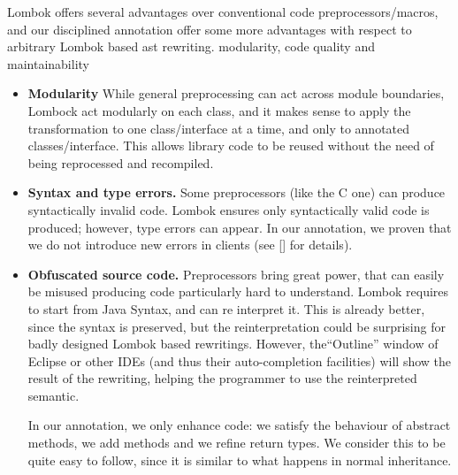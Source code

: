 \noindent 
Lombok offers several advantages over conventional code preprocessors/macros, 
and our disciplined \mixin annotation offer some more advantages with respect to arbitrary Lombok based
ast rewriting.
modularity, code quality and maintainability
\begin{itemize}
\item \textbf{Modularity}
While general preprocessing can act across module boundaries, Lombock act modularly on each class, and it makes
sense to apply the transformation to one class/interface at a time, and only to annotated classes/interface.
This allows library code to be reused without the need of being
reprocessed and recompiled.

\item \textbf{Syntax and type errors.} 
Some preprocessors (like the C one) can produce syntactically invalid code.
Lombok ensures only syntactically valid code is produced; however, type errors can appear.
In our annotation, we proven that we do not introduce new errors in clients (see [] for details).

\item \textbf{Obfuscated source code.}
Preprocessors bring great power, that can easily be misused producing 
code particularly hard to understand.
Lombok requires to start from Java Syntax, and can re interpret it.
This is already better, since the syntax is preserved, but the reinterpretation could be surprising for 
badly designed Lombok based rewritings.
However, the``Outline'' window of Eclipse or other IDEs (and thus their auto-completion facilities)
will show the result of the rewriting, helping the programmer to use the reinterpreted semantic.

In our annotation, we only enhance code:
we satisfy the behaviour of abstract methods, we add methods and we refine return types.
We consider this to be quite easy to follow, since it is similar to what happens in normal inheritance.

\end{itemize}


